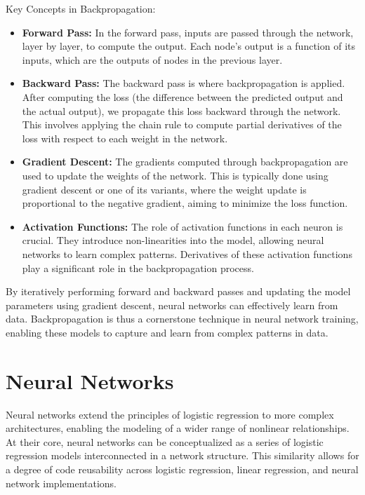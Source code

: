 \documentclass[twoside,11pt]{report}
\begin{document}
    Key Concepts in Backpropagation:

    \begin{itemize}
        \item \textbf{Forward Pass:} In the forward pass, inputs are passed through the network, layer by layer, 
            to compute the output. Each node's output is a function of its inputs, which are the outputs of 
            nodes in the previous layer.

        \item \textbf{Backward Pass:} The backward pass is where backpropagation is applied. After computing 
            the loss (the difference between the predicted output and the actual output), we propagate 
            this loss backward through the network. This involves applying the chain rule to compute partial 
            derivatives of the loss with respect to each weight in the network.

        \item \textbf{Gradient Descent:} The gradients computed through backpropagation are used to update 
            the weights of the network. This is typically done using gradient descent or one of its variants, 
            where the weight update is proportional to the negative gradient, aiming to minimize the loss function.

        \item \textbf{Activation Functions:} The role of activation functions in each neuron is crucial. 
            They introduce non-linearities into the model, allowing neural networks to learn complex patterns. 
            Derivatives of these activation functions play a significant role in the backpropagation process.
    \end{itemize}

    By iteratively performing forward and backward passes and updating the model parameters using gradient descent, 
    neural networks can effectively learn from data. Backpropagation is thus a cornerstone technique in 
    neural network training, enabling these models to capture and learn from complex patterns in data.




\section{Neural Networks}
\label{sec:NN}

    Neural networks extend the principles of logistic regression to more complex architectures, enabling the 
    modeling of a wider range of nonlinear relationships. At their core, neural networks can be conceptualized 
    as a series of logistic regression models interconnected in a network structure. This similarity allows for a 
    degree of code reusability across logistic regression, linear regression, and neural network implementations.
\end{document}
